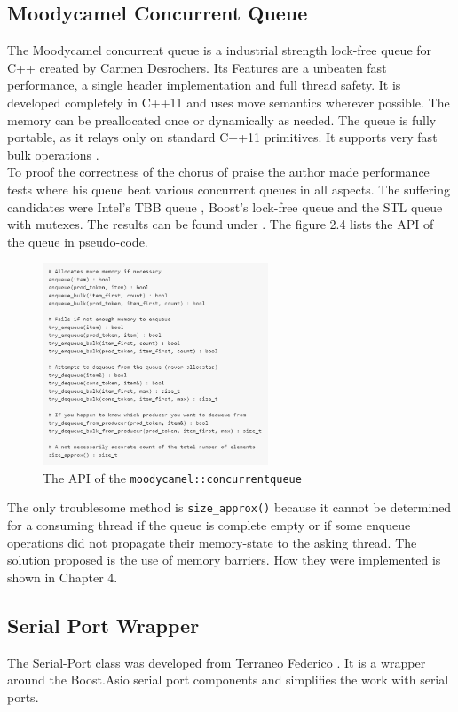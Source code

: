 \subsection{Moodycamel Concurrent Queue}
The Moodycamel concurrent queue is a industrial strength lock-free queue for C++ created by Carmen Desrochers. Its Features are a unbeaten fast performance, a single header implementation and full thread safety. It is developed completely in C++11 and uses move semantics wherever possible. The memory can be preallocated once or dynamically as needed. The queue is fully portable, as it relays only on standard C++11 primitives. It supports very fast bulk operations \cite{moody}.\\
To proof the correctness of the chorus of praise the author made performance tests where his queue beat various concurrent queues in all aspects. The suffering candidates were Intel's TBB queue \cite{intel_tbb}, Boost's lock-free queue and the STL queue with mutexes. The results can be found under \cite{benchmark}. The figure 2.4 lists the API of the queue in pseudo-code.
\begin{figure}[h]
\centering
      \includegraphics[width=0.6\textwidth]{moody}
        \caption{The API of the \texttt{moodycamel::concurrentqueue}}
\end{figure}
The only troublesome method is \texttt{size\_approx()} because it cannot be determined for a consuming thread if the queue is complete empty or if some enqueue operations did not propagate their memory-state to the asking thread. The solution proposed is the use of memory barriers. How they were implemented is shown in Chapter 4.
\subsection{Serial Port Wrapper}
The Serial-Port class was developed from Terraneo Federico \cite{serport}. It is a wrapper around the Boost.Asio serial port components and simplifies the work with serial ports. 